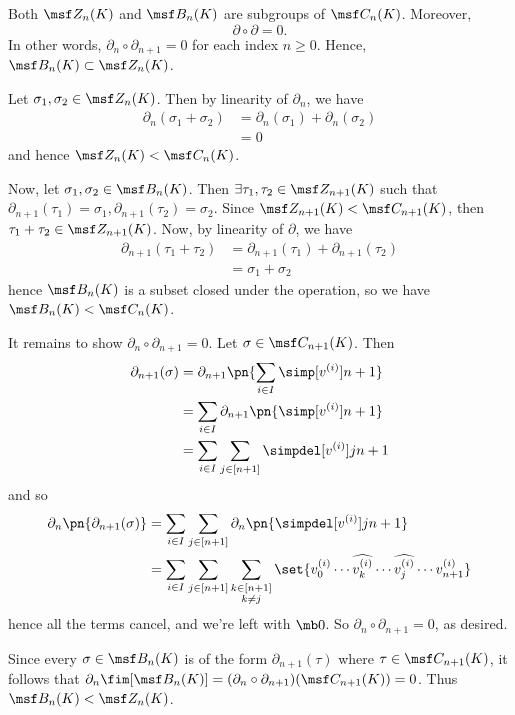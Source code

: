 \begin{problem}[16.4]
  Both $\msf Z_n(K)$ and $\msf B_n(K)$ are subgroups of $\msf C_n(K)$. Moreover,
  \[
    \partial \circ \partial = 0.
  \]
  In other words, $\partial_n \circ \partial_{n+1} = 0$ for each index $n \geq
  0$. Hence, $\msf B_n(K) \subset \msf Z_n(K)$.
\end{problem}
\begin{solution}
  Let $\sigma_1, \sigma_2 \in \msf Z_n(K)$. Then by linearity of $\partial_n$,
  we have
  \begin{align*}
    \partial_n(\sigma_1 + \sigma_2)
    &= \partial_n(\sigma_1) + \partial_n(\sigma_2) \\
    &= 0
  \end{align*}
  and hence $\msf Z_n(K) < \msf C_n(K)$.

  Now, let $\sigma_1, \sigma_2 \in \msf B_n(K)$. Then $\exists \tau_1, \tau_2
  \in \msf Z_{n+1}(K)$ such that $\partial_{n+1}(\tau_1) = \sigma_1,
  \partial_{n+1}(\tau_2) = \sigma_{2}$. Since $\msf Z_{n+1}(K) < \msf
  C_{n+1}(K)$, then $\tau_1 + \tau_2 \in \msf Z_{n+1}(K)$. Now, by linearity of
  $\partial$, we have
  \begin{align*}
    \partial_{n+1}(\tau_1 + \tau_2)
    &= \partial_{n+1}(\tau_1) + \partial_{n+1}(\tau_2) \\
    &= \sigma_1 + \sigma_2
  \end{align*}
  hence $\msf B_n(K)$ is a subset closed under the operation, so we have $\msf
  B_n(K) < \msf C_n(K)$.

  It remains to show $\partial_n \circ \partial_{n+1} = 0$. Let $\sigma \in \msf
  C_{n+1}(K)$. Then
  \begin{align*}
    \partial_{n+1}(\sigma)
    &= \partial_{n+1}\pn{\sum_{i \in I} \simp[v^{(i)}]{n+1}} \\
    &= \sum_{i\in I} \partial_{n+1}\pn{\simp[v^{(i)}]{n+1}} \\
    &= \sum_{i\in I} \sum_{j \in [n+1]} \simpdel[v^{(i)}]{j}{n+1}
  \end{align*}
  and so
  \begin{align*}
    \partial_n \pn{\partial_{n+1}(\sigma)}
    &= \sum_{i\in I} \sum_{j \in [n+1]} \partial_{n}\pn{\simpdel[v^{(i)}]{j}{n+1}} \\
    &= \sum_{i\in I} \sum_{j \in [n+1]} \sum_{\substack{k \in [n+1] \\ k \neq j}} \set{v_0^{(i)} \cdots \widehat{v_k^{(i)}} \cdots \widehat{v_j^{(i)}}\cdots v^{(i)}_{n+1}}
  \end{align*}
  hence all the terms cancel, and we're left with $\mb 0$. So $\partial_n \circ
  \partial_{n+1} = 0$, as desired.

  Since every $\sigma \in \msf B_n(K)$ is of the form $\partial_{n+1}(\tau)$
  where $\tau \in \msf C_{n+1}(K)$, it follows that $\partial_n\fim[\msf
  B_n(K)] = (\partial_n \circ \partial_{n+1}) (\msf C_{n+1}(K)) = 0$. Thus $\msf
  B_n(K) < \msf Z_n(K)$.
\end{solution}
